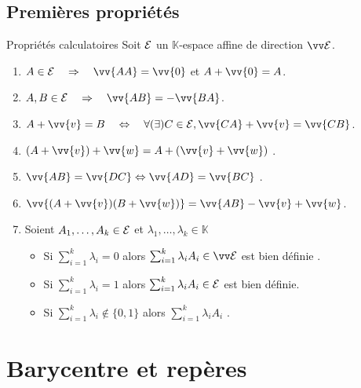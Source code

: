 \documentclass{m53beamer}
\begin{document}
\subsection{Premières propriétés}
  \begin{frame}{Propriétés calculatoires}
    Soit $\mathcal{E}$ un $\mathbb{K}$-espace affine de direction $\ev{E}$.
    \begin{enumerate}[<+(1)->]
      \item $A \in \ens{E} \quad\Rightarrow\quad \vv{AA}=\vv{0}$ et $A+\vv{0}=A$.
      \item $A,B \in \ens{E} \quad\Rightarrow\quad \vv{AB}=-\vv{BA}$.
      \item $A+\vv{v}=B  \quad\Leftrightarrow\quad \forall (\exists) C \in \ens{E}, \vv{CA}+\vv{v}=\vv{CB}$.
      \item $(A+\vv{v})+\vv{w}=A+(\vv{v}+\vv{w})$ .
      \item $\vv{AB}=\vv{DC} \Leftrightarrow \vv{AD}=\vv{BC}$ .
      \item $\vv{(A+\vv{v})(B+\vv{w})}=\vv{AB}-\vv{v}+\vv{w}$.
      \item Soient $A_{1},\ldots,A_{k} \in \mathcal{E}$ et $\lambda_{1},\ldots,\lambda_{k} \in \mathbb{K}$
        \begin{itemize}[<+(1)->]
          \item Si $\sum_{i=1}^{k}\lambda_{i}=0$ alors $\sum_{i=1}^{k}\lambda_{i}A_{i} \in \ev{E}$ est bien définie .
          \item Si $\sum_{i=1}^{k}\lambda_{i}=1$ alors $\sum_{i=1}^{k}\lambda_{i}A_{i} \in \mathcal{E}$ est bien définie.
          \item Si $\sum_{i=1}^{k}\lambda_{i}\notin \{0,1\}$ alors $\sum_{i=1}^{k}\lambda_{i}A_{i}$ .
        \end{itemize}\pause
    \end{enumerate}
  \end{frame}
\section{Barycentre et repères}
\end{document}

